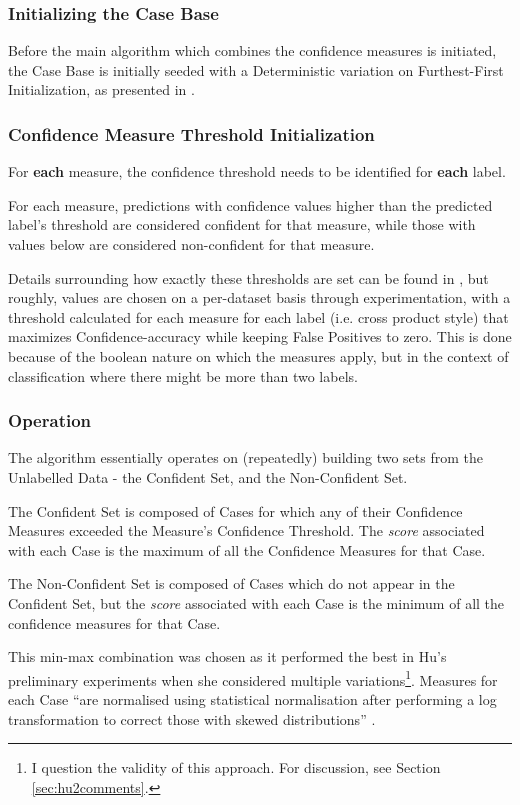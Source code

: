 \documentclass[a4paper,11pt]{report}
\begin{document}
\subsubsection{Initializing the Case Base}
Before the main algorithm which combines the confidence measures is initiated, the Case Base is initially seeded with a Deterministic variation on Furthest-First Initialization, as presented in \citet{Greene2007}.

\subsubsection{Confidence Measure Threshold Initialization}
For \textbf{each} measure, the confidence threshold needs to be identified for \textbf{each} label.

For each measure, predictions with confidence values higher than the predicted label's threshold are considered confident for that measure, while those with values below are considered non-confident for that measure.

Details surrounding how exactly these thresholds are set can be found in \citet{Delany2005}, but roughly, values are chosen on a per-dataset basis through experimentation, with a threshold calculated for each measure for each label (i.e. cross product style) that maximizes Confidence-accuracy while keeping False Positives to zero. This is done because of the boolean nature on which the measures apply, but in the context of classification where there might be more than two labels. 

\subsubsection{Operation}
The algorithm essentially operates on (repeatedly) building two sets from the Unlabelled Data - the Confident Set, and the Non-Confident Set.

The Confident Set is composed of Cases for which any of their Confidence Measures exceeded the Measure's Confidence Threshold. The \emph{score} associated with each Case is the maximum of all the Confidence Measures for that Case.

The Non-Confident Set is composed of Cases which do not appear in the Confident Set, but the \emph{score} associated with each Case is the minimum of all the confidence measures for that Case. 

This min-max combination was chosen as it performed the best in Hu's preliminary experiments when she considered multiple variations\footnote{I question the validity of this approach. For discussion, see Section \ref{sec:hu2comments}.}. Measures for each Case ``are normalised using statistical normalisation after performing a log transformation to correct those with skewed distributions'' \citep{Hu2011}.
\end{document}
